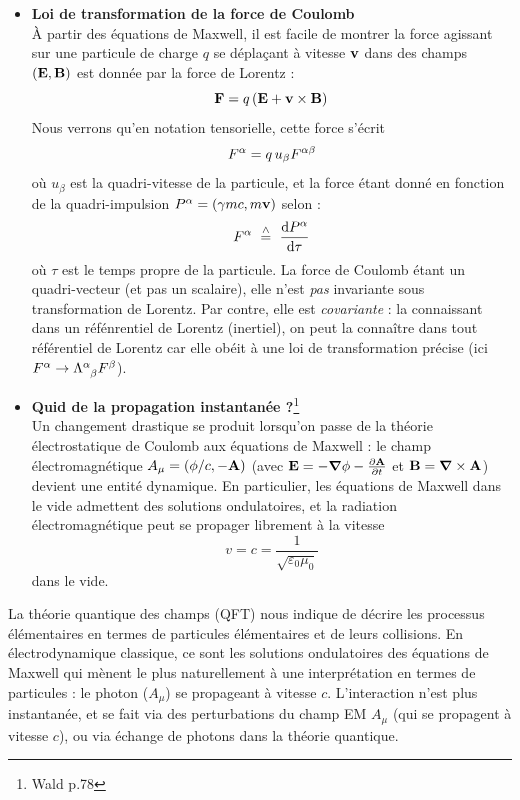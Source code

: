 \begin{itemize}
    \item \textbf{Loi de transformation de la force de Coulomb}\\
    À partir des équations de Maxwell, il est facile de montrer la force agissant sur une particule de charge $q$ se déplaçant à vitesse $\bm{\mathrm{v}}$ dans des champs $(\bm{\mathrm{E}},\bm{\mathrm{B}})$ est donnée par la force de Lorentz :
    \begin{equation}
        \bm{\mathrm{F}} = q\,  (\bm{\mathrm{E}} + \bm{\mathrm{v}} \times \bm{\mathrm{B}})
    \end{equation}
    Nous verrons qu'en notation tensorielle, cette force s'écrit 
    \begin{equation}
        F^\alpha = q \, u_\beta F\indices{^\alpha ^\beta}
    \end{equation}
    où $u_\beta$ est la quadri-vitesse de la particule, et la force étant donné en fonction de la quadri-impulsion $P^\alpha = (\gamma m c, m \bm{\mathrm{v}})$ selon :
    \begin{equation}
        F^\alpha \deq \frac{\td P\indices{^\alpha}}{\td \tau}
    \end{equation}
    où $\tau$ est le temps propre de la particule. La force de Coulomb étant un quadri-vecteur (et pas un scalaire), elle n'est \emph{pas} invariante sous transformation de Lorentz. Par contre, elle est \emph{covariante} : la connaissant dans un réfénrentiel de Lorentz (inertiel), on peut la connaître dans tout référentiel de Lorentz car elle obéit à une loi de transformation précise (ici $F^\alpha \to \Lambda\indices{^\alpha_\beta}F^\beta$).\\
    \item \textbf{Quid de la propagation instantanée ?}\footnote{Wald p.78}\\
    Un changement drastique se produit lorsqu'on passe de la théorie électrostatique de Coulomb aux équations de Maxwell : le champ électromagnétique $A_\mu = (\phi/c, - \bm{\mathrm{A}})$ (avec $\bm{\mathrm{E}} = - \bm{\mathrm{\nabla}} \phi - \frac{\partial \bm{\mathrm{A}}}{\partial t}$ et $\bm{\mathrm{B}} = \bm{\mathrm{\nabla}} \times \bm{\mathrm{A}}$) devient une entité dynamique. En particulier, les équations de Maxwell dans le vide admettent des solutions ondulatoires, et la radiation électromagnétique peut se propager librement à la vitesse
    \begin{equation}
        v = c = \frac{1}{\sqrt{\varepsilon_0\mu_0}}
    \end{equation}
    dans le vide.
\end{itemize}
\begin{rmk}
    La théorie quantique des champs (QFT) nous indique de décrire les processus élémentaires en termes de particules élémentaires et de leurs collisions. En électrodynamique classique, ce sont les solutions ondulatoires des équations de Maxwell qui mènent le plus naturellement à une interprétation en termes de particules : le photon ($A_\mu$) se propageant à vitesse $c$. L'interaction n'est plus instantanée, et se fait via des perturbations du champ EM $A_\mu$ (qui se propagent à vitesse $c$), ou via échange de photons dans la théorie quantique.
\end{rmk}
